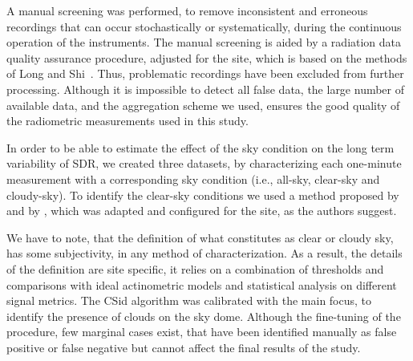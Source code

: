 \documentclass[applsci,article,submit,moreauthors,pdftex]{Definitions/mdpi}
\begin{document}
A manual screening was performed, to remove inconsistent and erroneous
recordings that can occur stochastically or systematically, during the
continuous operation of the instruments. The manual screening is aided
by a radiation data quality assurance procedure, adjusted for the site,
which is based on the methods of Long and
Shi~\citetext{\citeyear{Long2008a}; \citeyear{Long2006}}. Thus,
problematic recordings have been excluded from further processing.
Although it is impossible to detect all false data, the large number of
available data, and the aggregation scheme we used, ensures the good
quality of the radiometric measurements used in this study.

In order to be able to estimate the effect of the sky condition on the
long term variability of SDR, we created three datasets, by
characterizing each one-minute measurement with a corresponding sky
condition (i.e., all-sky, clear-sky and cloudy-sky). To identify the
clear-sky conditions we used a method proposed by \citet{Long2000} and
by \citet{Reno2016}, which was adapted and configured for the site, as
the authors suggest.

We have to note, that the definition of what constitutes as clear or
cloudy sky, has some subjectivity, in any method of characterization. As
a result, the details of the definition are site specific, it relies on
a combination of thresholds and comparisons with ideal actinometric
models and statistical analysis on different signal metrics. The CSid
algorithm was calibrated with the main focus, to identify the presence
of clouds on the sky dome. Although the fine-tuning of the procedure,
few marginal cases exist, that have been identified manually as false
positive or false negative but cannot affect the final results of the
study.
\end{document}
